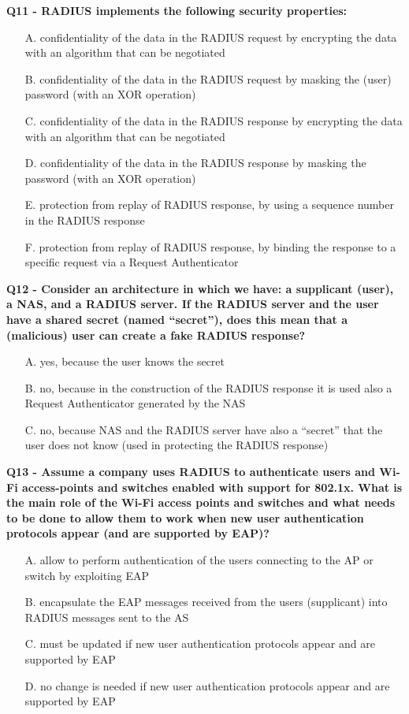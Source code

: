 \textbf{Q11 - RADIUS implements the following security properties:}
\begin{itemize}
    \item[A.] confidentiality of the data in the RADIUS request by encrypting the data with an algorithm that can be negotiated
    \item[B.] confidentiality of the data in the RADIUS request by masking the (user) password (with an XOR operation)
    \item[C.] confidentiality of the data in the RADIUS response by encrypting the data with an algorithm that can be negotiated
    \item[D.] confidentiality of the data in the RADIUS response by masking the password (with an XOR operation)
    \item[E.] protection from replay of RADIUS response, by using a sequence number in the RADIUS response
    \item[F.] protection from replay of RADIUS response, by binding the response to a specific request via a Request Authenticator
\end{itemize}

\textbf{Q12 - Consider an architecture in which we have: a supplicant (user), a NAS, and a RADIUS server. If the
RADIUS server and the user have a shared secret (named “secret”), does this mean that a (malicious) user can create
a fake RADIUS response?}
\begin{itemize}
    \item[A.] yes, because the user knows the secret
    \item[B.] no, because in the construction of the RADIUS response it is used also a Request Authenticator generated by the NAS
    \item[C.] no, because NAS and the RADIUS server have also a “secret” that the user does not know (used in protecting the RADIUS response)
\end{itemize}

\textbf{Q13 - Assume a company uses RADIUS to authenticate users and Wi-Fi access-points and switches enabled with support
for 802.1x. What is the main role of the Wi-Fi access points and switches and what needs to be done to allow them to
work when new user authentication protocols appear (and are supported by EAP)?}
\begin{itemize}
    \item[A.] allow to perform authentication of the users connecting to the AP or switch by exploiting EAP
    \item[B.] encapsulate the EAP messages received from the users (supplicant) into RADIUS messages sent to the AS
    \item[C.] must be updated if new user authentication protocols appear and are supported by EAP
    \item[D.] no change is needed if new user authentication protocols appear and are supported by EAP
\end{itemize}


